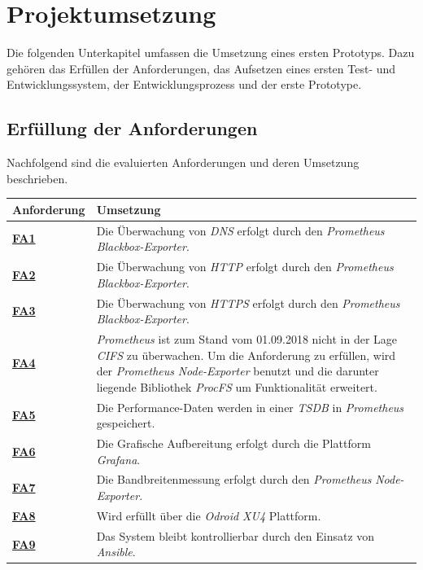 \documentclass[titlepage]{report}
\begin{document}
\chapter{Projektumsetzung}
Die folgenden Unterkapitel umfassen die Umsetzung eines ersten
Prototyps. Dazu gehören das Erfüllen der Anforderungen, das Aufsetzen
eines ersten Test- und Entwicklungssystem, der Entwicklungsprozess
und der erste Prototype.
\section{Erfüllung der Anforderungen}
Nachfolgend sind die evaluierten Anforderungen und deren Umsetzung
beschrieben.
\tabulinesep=1.2mm
\begin{center}
    \begin{tabu}{X[-1] X}
\toprule
\textbf{Anforderung} & \textbf{Umsetzung}  \\
\midrule
        \hyperref[table:FA1]{\textbf{FA1}} & Die Überwachung von \emph{DNS} erfolgt durch den \emph{Prometheus} \emph{Blackbox-Exporter}. \\
        \hyperref[table:FA2]{\textbf{FA2}} & Die Überwachung von \emph{HTTP} erfolgt durch den \emph{Prometheus} \emph{Blackbox-Exporter}. \\
        \hyperref[table:FA3]{\textbf{FA3}} & Die Überwachung von \emph{HTTPS} erfolgt durch den \emph{Prometheus} \emph{Blackbox-Exporter}. \\
        \hyperref[table:FA4]{\textbf{FA4}} & \emph{Prometheus} ist zum Stand vom 01.09.2018 nicht in der Lage \emph{CIFS} zu überwachen. Um die Anforderung zu erfüllen, wird der \emph{Prometheus} \emph{Node-Exporter} benutzt und die darunter liegende Bibliothek \emph{ProcFS} um Funktionalität erweitert. \\
        \hyperref[table:FA5]{\textbf{FA5}} & Die Performance-Daten werden in einer \emph{TSDB} in \emph{Prometheus} gespeichert. \\
        \hyperref[table:FA6]{\textbf{FA6}} & Die Grafische Aufbereitung erfolgt durch die Plattform \emph{Grafana}. \\
        \hyperref[table:FA7]{\textbf{FA7}} & Die Bandbreitenmessung erfolgt durch den \emph{Prometheus} \emph{Node-Exporter}. \\
        \hyperref[table:FA8]{\textbf{FA8}} & Wird erfüllt über die \emph{Odroid XU4} Plattform. \\
        \hyperref[table:FA9]{\textbf{FA9}} & Das System bleibt kontrollierbar durch den Einsatz von \emph{Ansible}. \\
\bottomrule
    \end{tabu}
    \label{table:mapping1}
\end{center}
\end{document}
